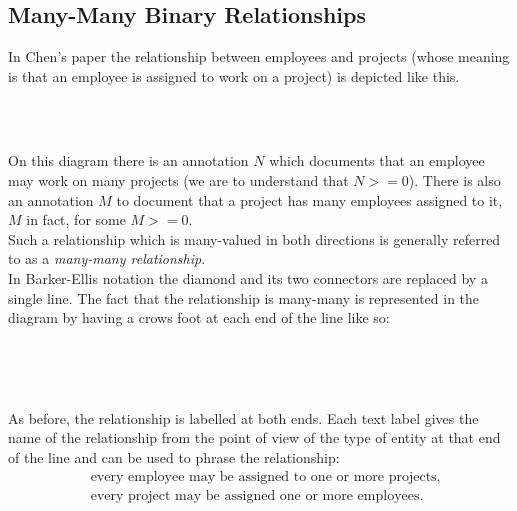 \subsection{Many-Many Binary Relationships}
In Chen's paper the relationship between employees and projects (whose meaning is that
an employee is assigned to work on a project) is depicted like this.
\begin{gather}
\label{projectWorkerChenStyle}
\raisebox{-0.9cm}{\scalebox{0.9}{

}}
\end{gather}
On this diagram there is an annotation $N$ which documents that an employee may work on many projects (we are to understand that $N >= 0$). There is also an annotation $M$ to document that
a project has many employees assigned to it, $M$ in fact, for some $M >= 0$. \\
\noindent Such a relationship which is many-valued in both directions is generally 
referred to as a \textit{many-many relationship}.  \\
\noindent In Barker-Ellis notation the diamond and its two connectors are replaced by a single line. The fact that the relationship is many-many is represented in the diagram by having a crows foot at each end of the line like so:

\begin{gather}
\label{employeeProjectWorker}
\raisebox{-1cm}{

}
\end{gather}

\noindent As before, the relationship is labelled at both ends. Each text label gives the name of the relationship from the point of view of the type of entity at that end of the line and can be used to phrase the relationship:
\begin{align}
\label{assignedToText}&\mbox{every employee may be assigned to one or more projects,} \\
\label{assignedText}&\mbox{every project may be assigned one or more employees.}
\end{align}
\newpage
